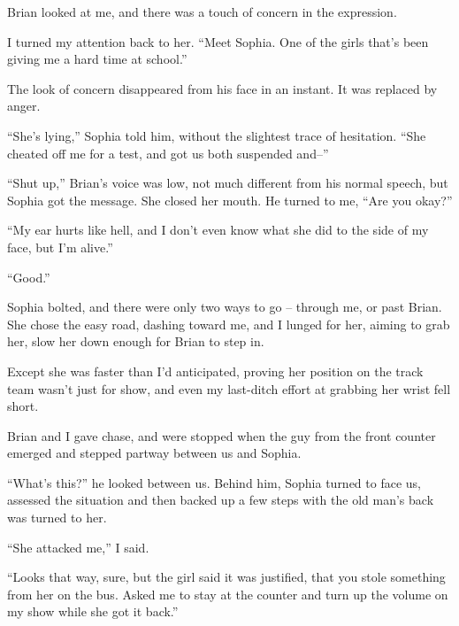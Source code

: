 Brian looked at me, and there was a touch of concern in the expression.



I turned my attention back to her.  ``Meet Sophia.  One of the girls that's been giving me a hard time at school.''



The look of concern disappeared from his face in an instant.  It was replaced by anger.



``She's lying,'' Sophia told him, without the slightest trace of hesitation. ``She cheated off me for a test, and got us both suspended and--''



``Shut up,'' Brian's voice was low, not much different from his normal speech, but Sophia got the message.  She closed her mouth.  He turned to me, ``Are you okay?''



``My ear hurts like hell, and I don't even know what she did to the side of my face, but I'm alive.''



``Good.''



Sophia bolted, and there were only two ways to go – through me, or past Brian.  She chose the easy road, dashing toward me, and I lunged for her, aiming to grab her, slow her down enough for Brian to step in.



Except she was faster than I'd anticipated, proving her position on the track team wasn't just for show, and even my last-ditch effort at grabbing her wrist fell short.



Brian and I gave chase, and were stopped when the guy from the front counter emerged and stepped partway between us and Sophia.



``What's this?'' he looked between us.  Behind him, Sophia turned to face us, assessed the situation and then backed up a few steps with the old man's back was turned to her.



``She attacked me,'' I said.



``Looks that way, sure, but the girl said it was justified, that you stole something from her on the bus.  Asked me to stay at the counter and turn up the volume on my show while she got it back.''




